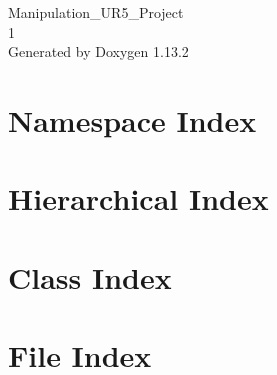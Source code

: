 \documentclass[twoside]{book}
\newcommand{\+}{\discretionary{\mbox{\scriptsize$\hookleftarrow$}}{}{}}
\newcommand{\clearemptydoublepage}{%
    \newpage{\pagestyle{empty}\cleardoublepage}%
  }
\begin{document}
  \raggedbottom
    \hypersetup{pageanchor=false,
                bookmarksnumbered=true,
                pdfencoding=unicode
               }
  \begin{titlepage}
  \vspace*{7cm}
  \begin{center}%
  {\Large Manipulation\+\_\+\+UR5\+\_\+\+Project}\\
  [1ex]\large 1 \\
  \vspace*{1cm}
  {\large Generated by Doxygen 1.13.2}\\
  \end{center}
  \end{titlepage}
  \clearemptydoublepage
  \tableofcontents
  \clearemptydoublepage
  \hypersetup{pageanchor=true}



\chapter{Namespace Index}

\chapter{Hierarchical Index}

\chapter{Class Index}

\chapter{File Index}

\end{document}
